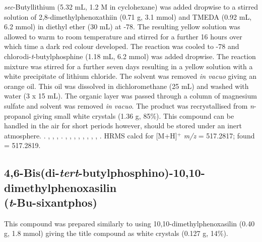 \noindent{}\emph{sec}-Butyllithium (5.32 mL, 1.2 M in cyclohexane) was added dropwise to a stirred solution of 2,8-dimethylphenoxathiin (0.71 g, 3.1 mmol) and TMEDA (0.92 mL, 6.2 mmol) in diethyl ether (30 mL) at -78\degC{}.  The resulting yellow solution was allowed to warm to room temperature and stirred for a further 16 hours over which time a dark red colour developed.  The reaction was cooled to -78\degC{} and chlorodi-\emph{t}-butylphosphine (1.18 mL, 6.2 mmol) was added dropwise.  The reaction mixture was stirred for a further seven days resulting in a yellow solution with a white precipitate of lithium chloride.  The solvent was removed \emph{in vacuo} giving an orange oil.  This oil was dissolved in dichloromethane (25 mL) and washed with water (3 x 15 mL).  The organic layer was passed through a column of magnesium sulfate and solvent was removed \emph{in vacuo}.  The product was recrystallised from \emph{n}-propanol giving small white crystals (1.36 g, 85\%).  This compound can be handled in the air for short periods however, should be stored under an inert atmosphere.
.
,
,
,
.
,
,
,
,
,
,
,
,
.
HRMS calcd for  [M+H]$^+$ \emph{m/z} = 517.2817; found = 517.2819.

\subsection*{4,6-Bis(di-\emph{tert}-butylphosphino)-10,10-dimethylphenoxasilin \\(\emph{t}-Bu-sixantphos)}


This compound was prepared similarly to \tButhixantphos{} using 10,10-dimethyl\-phenoxasilin (0.40 g, 1.8 mmol) giving the title compound as white crystals (0.127 g, 14\%).

